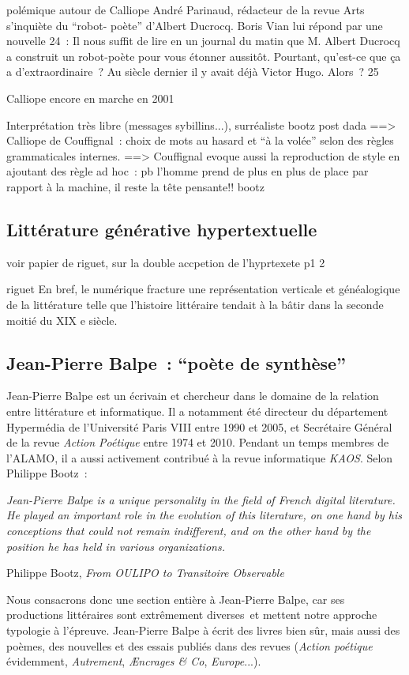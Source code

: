 \documentclass{article}
\newenvironment{citationbox}
{\begin{center}
		\begin{minipage}{.8\textwidth}
		}
		{
		\end{minipage}	
\end{center}
}
\begin{document}
				
				
				polémique autour de Calliope
				André Parinaud, rédacteur de la revue Arts s'inquiète du ``robot-
				poète'' d'Albert Ducrocq. Boris Vian lui répond par une nouvelle 24~:
				Il nous suffit de lire en un journal du matin que M. Albert Ducrocq a
				construit un robot-poète pour vous étonner aussitôt. Pourtant, qu'est-ce que
				ça a d'extraordinaire~? Au siècle dernier il y avait déjà Victor Hugo.
				Alors~? 25
				
				Calliope encore en marche en 2001
				
				
				Interprétation très libre (messages sybillins...), surréaliste bootz post dada
				==> Calliope de Couffignal~: choix de mots au hasard et “à la volée” selon des règles grammaticales internes. 
				==> Couffignal evoque aussi la reproduction de style en ajoutant des règle ad hoc~: pb l'homme prend de plus en plus de place par rapport à la machine, il reste la tête pensante!! bootz
		\subsection{Littérature générative hypertextuelle}
			voir papier de riguet, sur la double accpetion de l'hyprtexete p1 2
			
			riguet En bref, le numérique fracture une
			représentation verticale et généalogique de la littérature telle que l’histoire littéraire tendait à la bâtir
			dans la seconde moitié du XIX e siècle.
				
		\subsection{Jean-Pierre Balpe~: ``poète de synthèse''}\label{balpe}
			Jean-Pierre Balpe est un écrivain et chercheur dans le domaine de la relation entre littérature et informatique. Il a notamment été directeur du département Hypermédia de l'Université Paris VIII entre 1990 et 2005, et Secrétaire Général de la revue \textit{Action Poétique} entre 1974 et 2010. Pendant un temps membres de l'ALAMO, il a aussi activement contribué à la revue informatique \textit{KAOS}. Selon Philippe Bootz~:
			\begin{citationbox}
				\textit{Jean-Pierre Balpe is a unique personality in the field of French digital literature. He played an important role in the evolution of this literature, on one hand by his conceptions that could not remain indifferent, and on the other hand by the position he has held in various organizations.}
				\begin{flushright}
					Philippe Bootz, \textit{From OULIPO to Transitoire Observable} \cite{bootz2012}
				\end{flushright}
			\end{citationbox}
			Nous consacrons donc une section entière à Jean-Pierre Balpe, car ses productions littéraires sont extrêmement diverses et mettent notre approche typologie à l'épreuve. Jean-Pierre Balpe à écrit des livres bien sûr, mais aussi des poèmes, des nouvelles et des essais publiés dans des revues (\textit{Action poétique} évidemment, \textit{Autrement}, \textit{Æncrages \& Co}, \textit{Europe}...).\\
			
\end{document}
